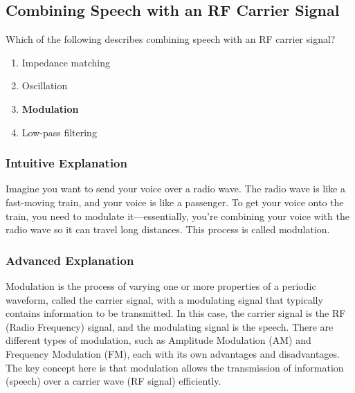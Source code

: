 \subsection{Combining Speech with an RF Carrier Signal}
\label{T7A08}

\begin{tcolorbox}[colback=gray!10!white,colframe=black!75!black,title=T7A08]
Which of the following describes combining speech with an RF carrier signal?
\begin{enumerate}[noitemsep]
    \item Impedance matching
    \item Oscillation
    \item \textbf{Modulation}
    \item Low-pass filtering
\end{enumerate}
\end{tcolorbox}

\subsubsection*{Intuitive Explanation}
Imagine you want to send your voice over a radio wave. The radio wave is like a fast-moving train, and your voice is like a passenger. To get your voice onto the train, you need to modulate it—essentially, you're combining your voice with the radio wave so it can travel long distances. This process is called modulation.

\subsubsection*{Advanced Explanation}
Modulation is the process of varying one or more properties of a periodic waveform, called the carrier signal, with a modulating signal that typically contains information to be transmitted. In this case, the carrier signal is the RF (Radio Frequency) signal, and the modulating signal is the speech. There are different types of modulation, such as Amplitude Modulation (AM) and Frequency Modulation (FM), each with its own advantages and disadvantages. The key concept here is that modulation allows the transmission of information (speech) over a carrier wave (RF signal) efficiently.